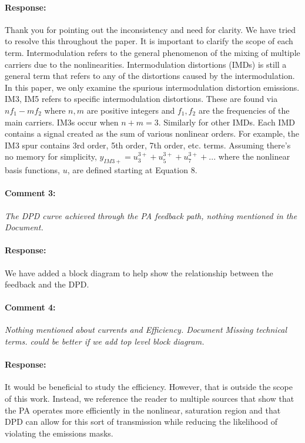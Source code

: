 \documentclass[]{article}
\begin{document}
\paragraph{Response:}
Thank you for pointing out the inconsistency and need for clarity. We have tried to resolve this throughout the paper. It is important to clarify the scope of each term. Intermodulation refers to the general phenomenon of the mixing of multiple carriers due to the nonlinearities. Intermodulation distortions (IMDs) is still a general term that refers to any of the distortions caused by the intermodulation. In this paper, we only examine the spurious intermodulation distortion emissions. IM3, IM5 refers to specific intermodulation distortions. These are found via $n f_1 - m f_2$ where $n,m$ are positive integers and $f_1, f_2$ are the frequencies of the main carriers. IM3s occur when $n+m = 3$. Similarly for other IMDs. Each IMD contains a signal created as the sum of various nonlinear orders. For example, the IM3 spur contains 3rd order, 5th order, 7th order, etc. terms. Assuming there's no memory for simplicity, $y_{IM3+} = u_3^{3+} + u_5^{3+} + u_7^{3+} + ...$ where the nonlinear basis functions, $u$, are defined starting at Equation 8.

\paragraph{Comment 3:}\textit{The DPD curve achieved through the PA feedback path, nothing mentioned in the Document.}
\paragraph{Response:}
We have added a block diagram to help show the relationship between the feedback and the DPD. 
	
\paragraph{Comment 4:}\textit{Nothing mentioned about currents and Efficiency. Document Missing technical terms. could be better if we add top level block diagram.
}
\paragraph{Response:}
It would be beneficial to study the efficiency. However, that is outside the scope of this work. Instead, we reference the reader to multiple sources that show that the PA operates more efficiently in the nonlinear, saturation region and that DPD can allow for this sort of transmission while reducing the likelihood of violating the emissions masks. 
\end{document}
